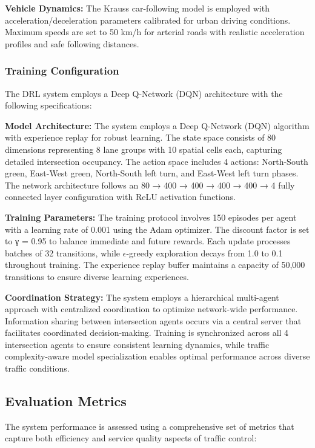 \textbf{Vehicle Dynamics:} The Krauss car-following model is employed with acceleration/deceleration 
parameters calibrated for urban driving conditions. Maximum speeds are set to 50 km/h for arterial 
roads with realistic acceleration profiles and safe following distances.

\subsubsection{Training Configuration}

The DRL system employs a Deep Q-Network (DQN) architecture with the following specifications:

\textbf{Model Architecture:} The system employs a Deep Q-Network (DQN) algorithm with experience 
replay for robust learning. The state space consists of 80 dimensions representing 8 lane groups 
with 10 spatial cells each, capturing detailed intersection occupancy. The action space includes 
4 actions: North-South green, East-West green, North-South left turn, and East-West left turn phases. 
The network architecture follows an 80 → 400 → 400 → 400 → 400 → 4 fully connected layer 
configuration with ReLU activation functions.

\textbf{Training Parameters:} The training protocol involves 150 episodes per agent with a learning 
rate of 0.001 using the Adam optimizer. The discount factor is set to γ = 0.95 to balance immediate 
and future rewards. Each update processes batches of 32 transitions, while $\epsilon$-greedy exploration 
decays from 1.0 to 0.1 throughout training. The experience replay buffer maintains a capacity of 
50,000 transitions to ensure diverse learning experiences.

\textbf{Coordination Strategy:} The system employs a hierarchical multi-agent approach with centralized 
coordination to optimize network-wide performance. Information sharing between intersection agents 
occurs via a central server that facilitates coordinated decision-making. Training is synchronized 
across all 4 intersection agents to ensure consistent learning dynamics, while traffic complexity-aware 
model specialization enables optimal performance across diverse traffic conditions.

\subsection{Evaluation Metrics}\label{subsec2b-2}

The system performance is assessed using a comprehensive set of metrics that capture both 
efficiency and service quality aspects of traffic control:

